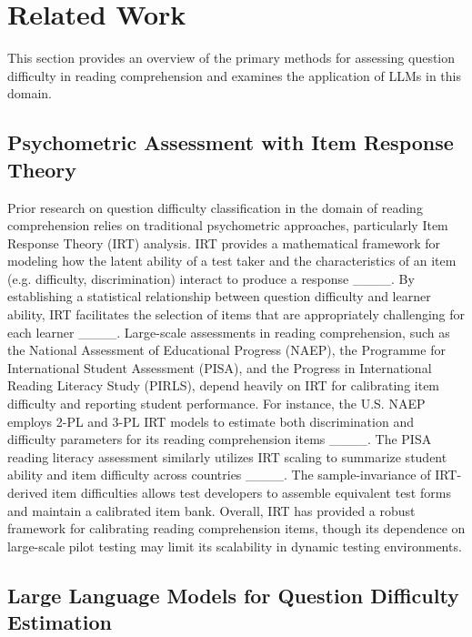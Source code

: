 \section{Related Work}
This section provides an overview of the primary methods for assessing question difficulty in reading comprehension and examines the application of LLMs in this domain. 

\subsection{Psychometric Assessment with Item Response Theory}

Prior research on question difficulty classification in the domain of reading comprehension relies on traditional psychometric approaches, particularly Item Response Theory (IRT) analysis. IRT provides a mathematical framework for modeling how the latent ability of a test taker and the characteristics of an item (e.g. difficulty, discrimination) interact to produce a response ____. By establishing a statistical relationship between question difficulty and learner ability, IRT facilitates the selection of items that are appropriately challenging for each learner ____. Large-scale assessments in reading comprehension, such as the National Assessment of Educational Progress (NAEP), the Programme for International Student Assessment (PISA), and the Progress in International Reading Literacy Study (PIRLS), depend heavily on IRT for calibrating item difficulty and reporting student performance. For instance, the U.S. NAEP employs 2-PL and 3-PL IRT models to estimate both discrimination and difficulty parameters for its reading comprehension items ____. The PISA reading literacy assessment similarly utilizes IRT scaling to summarize student ability and item difficulty across countries ____. The sample-invariance of IRT-derived item difficulties allows test developers to assemble equivalent test forms and maintain a calibrated item bank. Overall, IRT has provided a robust framework for calibrating reading comprehension items, though its dependence on large-scale pilot testing may limit its scalability in dynamic testing environments.

\subsection{Large Language Models for Question Difficulty Estimation}

